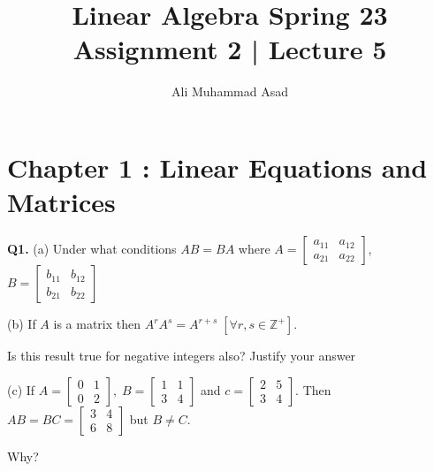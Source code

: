 \documentclass[addpoints]{exam}
\title{Linear Algebra Spring 23\\ Assignment 2 | Lecture 5}
\author{Ali Muhammad Asad}
\begin{document}
\maketitle
\begin{sloppypar}
\section*{\textbf{Chapter 1 : Linear Equations and Matrices}}
\begin{questions}
    \question
    \textbf{Q1. } (a) Under what conditions $ AB = BA $ where $ A = \begin{bmatrix}
        a_{11} & a_{12} \\ a_{21} & a_{22}
    \end{bmatrix} $, $ B = \begin{bmatrix}
        b_{11} & b_{12} \\ b_{21} & b_{22}
    \end{bmatrix} $ 

    \hspace{8.2mm} (b) If $A$ is a matrix then $ A^rA^s = A^{r + s}  \; [\forall r, s \in \mathbb{Z^+}]$. 
    
    \hspace{14mm} Is this result true for negative integers also? Justify your answer

    \hspace{8.2mm} (c) If $ A = \begin{bmatrix}
        0 & 1 \\ 0 & 2
    \end{bmatrix}, \; B = \begin{bmatrix}
        1 & 1 \\ 3 & 4
    \end{bmatrix} $ and $ c = \begin{bmatrix}
        2 & 5 \\ 3 & 4
    \end{bmatrix} $. Then $ AB = BC = \begin{bmatrix}
        3 & 4 \\ 6 & 8
    \end{bmatrix} $ but $ B \neq C $. 
    
    \hspace{14mm} Why?
    \begin{solution}
        

\end{solution}
\end{questions}
\end{sloppypar}
\end{document}
